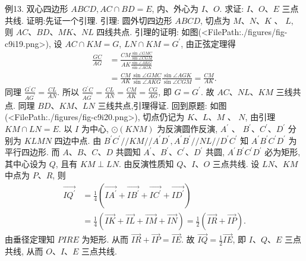 例13. 双心四边形 $A B C D, A C \cap B D=E$, 内、外心为 $I 、 O$. 求证: $I 、 O 、 E$ 三点共线.
证明:先证一个引理.
引理: 圆外切四边形 $A B C D$, 切点为 $M 、 N 、 K$ 、 $L$, 则 $A C 、 B D 、 M K 、 N L$ 四线共点.
引理的证明: 如图(<FilePath:./figures/fig-c9i19.png>), 设 $A C \cap K M=G$, $L N \cap K M=G^{\prime}$, 由正弦定理得
$$
\begin{aligned}
\frac{G C}{A G} & =\frac{C M \frac{\sin \angle G M C}{\sin \angle C G M}}{A K \frac{\sin \angle A K G}{\sin \angle A G K}} \\
& =\frac{C M}{A K} \frac{\sin \angle G M C}{\sin \angle A K G} \frac{\sin \angle A G K}{\sin \angle C G M}=\frac{C M}{A K} .
\end{aligned}
$$
同理 $\frac{G^{\prime} C}{A G^{\prime}}=\frac{C L}{A N}$.
所以 $\frac{G^{\prime} C}{A G^{\prime}}=\frac{C L}{A N}=\frac{C M}{A K}=\frac{C G}{A G}$, 即 $G=G^{\prime}$.
故 $A C 、 N L 、 K M$ 三线共点.
同理 $B D 、 K M 、 L N$ 三线共点,引理得证.
回到原题: 如图(<FilePath:./figures/fig-c9i20.png>), 切点仍记为 $K 、 L 、 M$ 、 $N$, 由引理 $K M \cap L N=E$.
以 $I$ 为中心, $\odot(K N M)$ 为反演圆作反演, $A^{\prime}$ 、 $B^{\prime} 、 C^{\prime} 、 D^{\prime}$ 分别为 $K L M N$ 四边中点.
由 $B^{\prime} C^{\prime} / / K M / / A^{\prime} D^{\prime}, A^{\prime} B^{\prime} / / N L / / D^{\prime} C^{\prime}$ 知 $A^{\prime} B^{\prime} C^{\prime} D^{\prime}$ 为平行四边形.
而 $A 、 B 、 C 、 D$ 共圆知 $A^{\prime} 、 B^{\prime} 、 C^{\prime} 、 D^{\prime}$ 共圆, $A^{\prime} B^{\prime} C^{\prime} D^{\prime}$ 必为矩形, 其中心设为 $Q$, 且有 $K M \perp L N$.
由反演性质知 $Q 、 I 、 O$ 三点共线.
设 $L N 、 K M$ 中点为 $P 、 R$, 则
$$
\begin{aligned}
\overrightarrow{I Q^{\prime}} & =\frac{1}{4}\left(\overrightarrow{I A^{\prime}}+\overrightarrow{I B^{\prime}}+\overrightarrow{I C^{\prime}}+\overrightarrow{I D^{\prime}}\right) \\
& =\frac{1}{4}(\overrightarrow{I K}+\overrightarrow{I L}+\overrightarrow{I M}+\overrightarrow{I N})=\frac{1}{2}(\overrightarrow{I R}+\overrightarrow{I P}) .
\end{aligned}
$$
由垂径定理知 $P I R E$ 为矩形.
从而 $\overrightarrow{I R}+\overrightarrow{I P}=\overrightarrow{I E}$.
故 $\overrightarrow{I Q}=\frac{1}{2} \overrightarrow{I E}$, 即 $I 、 Q 、 E$ 三点共线, 从而 $O 、 I 、 E$ 三点共线.


